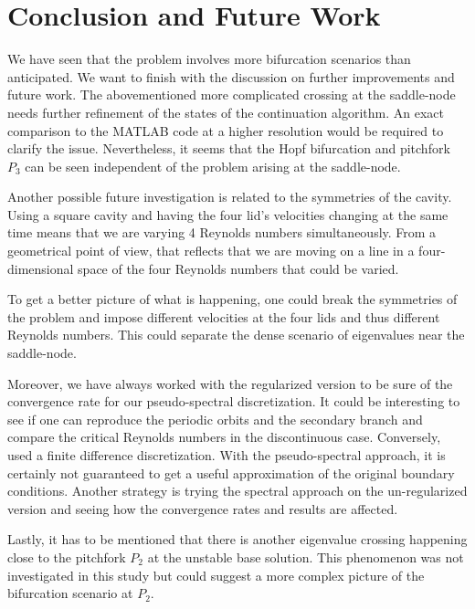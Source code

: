 
\section{Conclusion and Future Work} \label{concl}

We have seen that the problem involves more bifurcation scenarios than
anticipated. We want to finish with the discussion on further improvements and
future work. The abovementioned more complicated crossing at the saddle-node
needs further refinement of the states of the continuation algorithm. An exact
comparison to the MATLAB code at a higher resolution would be required to
clarify the issue. Nevertheless, it seems that the Hopf bifurcation and
pitchfork $P_3$ can be seen independent of the problem arising at the
saddle-node. 

Another possible future investigation is related to the symmetries of the
cavity. Using a square cavity and having the four lid's velocities changing at
the same time means that we are varying 4 Reynolds numbers simultaneously. From
a geometrical point of view, that reflects that we are moving on a line in a
four-dimensional space of the four Reynolds numbers that could be varied.

To get a better picture of what is happening, one could break the symmetries of
the problem and impose different velocities at the four lids and thus different
Reynolds numbers. This could separate the dense scenario of eigenvalues near
the saddle-node.

Moreover, we have always worked with the regularized version to be sure of the
convergence rate for our pseudo-spectral discretization. It could be
interesting to see if one can reproduce the periodic orbits and the secondary
branch and compare the critical Reynolds numbers in the discontinuous case.
Conversely, \citet{chen2013} used a finite difference discretization. With the
pseudo-spectral approach, it is certainly not guaranteed to get a useful
approximation of the original boundary conditions. Another strategy is trying
the spectral approach on the un-regularized version and seeing how the
convergence rates and results are affected.

Lastly, it has to be mentioned that there is another eigenvalue crossing
happening close to the pitchfork $P_2$ at the unstable base solution. This
phenomenon was not investigated in this study but could suggest a more complex
picture of the bifurcation scenario at $P_2$.

